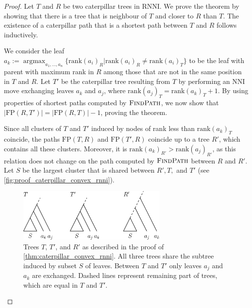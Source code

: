 \documentclass[11pt]{amsart}
\newcommand{\rnni}{\mathrm{RNNI}}
\newcommand{\findpath}{\textsc{FindPath}}
\newcommand{\rank}{\mathrm{rank}}
\newcommand{\nni}{\mathrm{NNI}}
\newcommand{\fp}{\mathrm{FP}}
\DeclareMathOperator*{\argmax}{argmax}
\begin{document}
\begin{proof}
	Let $T$ and $R$ be two caterpillar trees in $\rnni$.
	We prove the theorem by showing that there is a tree that is neighbour of $T$ and closer to $R$ than $T$.
	The existence of a caterpillar path that is a shortest path between $T$ and $R$ follows inductively.

	We consider the leaf $a_k := \argmax_{a_1, \ldots, a_n}\{\rank(a_i)_R | \rank(a_i)_R \neq \rank(a_i)_T\}$ to be the leaf with parent with maximum rank in $R$ among those that are not in the same position in $T$ and $R$.
	Let $T'$ be the caterpillar tree resulting from $T$ by performing an $\nni$ move exchanging leaves $a_k$ and $a_j$, where $\rank(a_j)_T = \rank(a_k)_T + 1$.
	By using properties of shortest paths computed by $\findpath$, we now show that $|\fp(R,T')| = |\fp(R,T)| - 1$, proving the theorem.

	Since all clusters of $T$ and $T'$ induced by nodes of rank less than $\rank(a_k)_T$ coincide, the paths $\fp(T,R)$ and $\fp(T',R)$ coincide up to a tree $R'$, which contains all these clusters.
	Moreover, it is $\rank(a_k)_{R'}  > \rank(a_j)_{R'}$, as this relation does not change on the path computed by $\findpath$ between $R$ and $R'$.
	Let $S$ be the largest cluster that is shared between $R', T,$ and $T'$ (see \autoref{fig:proof_caterpillar_convex_rnni}).

	\begin{figure}[ht]
		\includegraphics[width=0.66\textwidth]{proof_caterpillar_convex_rnni.eps}
		\caption{Trees $T$, $T'$, and $R'$ as described in the proof of \autoref{thm:caterpillar_convex_rnni}.
		All three trees share the subtree induced by subset $S$ of leaves.
		Between $T$ and $T'$ only leaves $a_j$ and $a_k$ are exchanged.
		Dashed lines represent remaining part of trees, which are equal in $T$ and $T'$.}
		\label{fig:proof_caterpillar_convex_rnni}
	\end{figure}


\end{proof}
\end{document}
